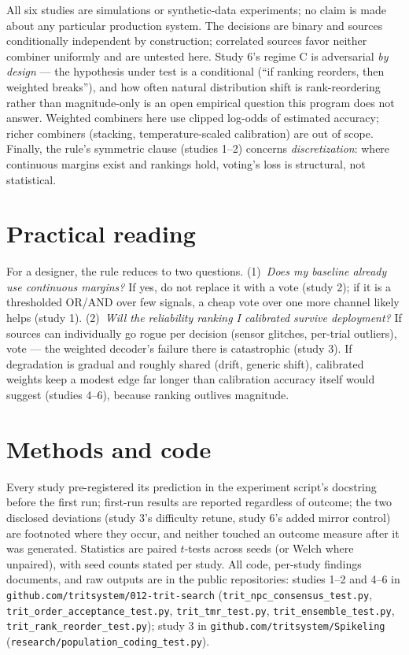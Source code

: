 \documentclass[aps,prapplied,preprint,amsmath,amssymb,floatfix]{revtex4-2}
\begin{document}
All six studies are simulations or synthetic-data experiments; no claim
is made about any particular production system. The decisions are binary
and sources conditionally independent by construction; correlated sources
favor neither combiner uniformly and are untested here. Study 6's regime
C is adversarial \emph{by design} --- the hypothesis under test is a
conditional (``if ranking reorders, then weighted breaks''), and how often
natural distribution shift is rank-reordering rather than magnitude-only
is an open empirical question this program does not answer. Weighted
combiners here use clipped log-odds of estimated accuracy; richer
combiners (stacking, temperature-scaled calibration) are out of scope.
Finally, the rule's symmetric clause (studies 1--2) concerns
\emph{discretization}: where continuous margins exist and rankings hold,
voting's loss is structural, not statistical.

\section{Practical reading}

For a designer, the rule reduces to two questions. (1)~\emph{Does my
baseline already use continuous margins?} If yes, do not replace it with
a vote (study 2); if it is a thresholded OR/AND over few signals, a
cheap vote over one more channel likely helps (study 1). (2)~\emph{Will
the reliability ranking I calibrated survive deployment?} If sources can
individually go rogue per decision (sensor glitches, per-trial outliers),
vote --- the weighted decoder's failure there is catastrophic (study 3).
If degradation is gradual and roughly shared (drift, generic shift),
calibrated weights keep a modest edge far longer than calibration
accuracy itself would suggest (studies 4--6), because ranking outlives
magnitude.

\section*{Methods and code}

Every study pre-registered its prediction in the experiment script's
docstring before the first run; first-run results are reported regardless
of outcome; the two disclosed deviations (study 3's difficulty retune,
study 6's added mirror control) are footnoted where they occur, and
neither touched an outcome measure after it was generated. Statistics are
paired $t$-tests across seeds (or Welch where unpaired), with seed counts
stated per study. All code, per-study findings documents, and raw outputs
are in the public repositories: studies 1--2 and 4--6 in
\texttt{github.com/tritsystem/012-trit-search} (\texttt{trit\_npc\_consensus\_test.py},
\texttt{trit\_order\_acceptance\_test.py}, \texttt{trit\_tmr\_test.py},
\texttt{trit\_ensemble\_test.py}, \texttt{trit\_rank\_reorder\_test.py});
study 3 in \texttt{github.com/tritsystem/Spikeling}
(\texttt{research/population\_coding\_test.py}).
\end{document}

